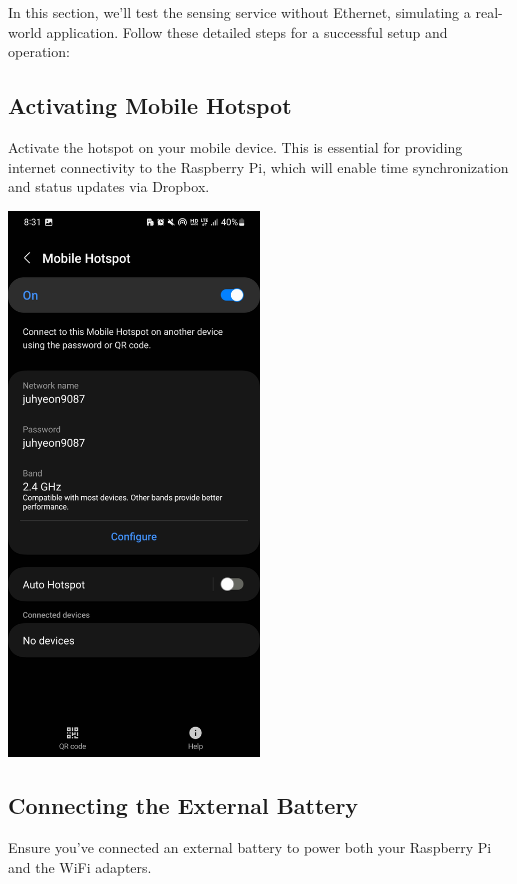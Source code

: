 \documentclass[
  letterpaper,
]{scrbook}
\begin{document}
In this section, we'll test the sensing service without Ethernet,
simulating a real-world application. Follow these detailed steps for a
successful setup and operation:

\subsection{Activating Mobile Hotspot}\label{activating-mobile-hotspot}

Activate the hotspot on your mobile device. This is essential for
providing internet connectivity to the Raspberry Pi, which will enable
time synchronization and status updates via Dropbox.

\includegraphics[width=0.5\textwidth,height=\textheight]{content/material/ch2/turnon_hotspot.jpg}

\subsection{Connecting the External
Battery}\label{connecting-the-external-battery}

Ensure you've connected an external battery to power both your Raspberry
Pi and the WiFi adapters.
\end{document}
